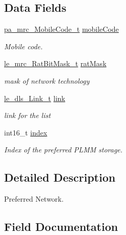 \subsection*{Data Fields}
\begin{DoxyCompactItemize}
\item 
\hyperlink{structpa__mrc___mobile_code__t}{pa\+\_\+mrc\+\_\+\+Mobile\+Code\+\_\+t} \hyperlink{structpa__mrc___preferred_network_operator__t_ab7cbecf26c76d4796fb5f2a2b1e22852}{mobile\+Code}
\begin{DoxyCompactList}\small\item\em Mobile code. \end{DoxyCompactList}\item 
\hyperlink{le__mrc__interface_8h_af643c7005da7f2466302eebdf7a29d93}{le\+\_\+mrc\+\_\+\+Rat\+Bit\+Mask\+\_\+t} \hyperlink{structpa__mrc___preferred_network_operator__t_abc5904f992fb84a3d3fc6d31bba9f298}{rat\+Mask}
\begin{DoxyCompactList}\small\item\em mask of network technology \end{DoxyCompactList}\item 
\hyperlink{structle__dls___link__t}{le\+\_\+dls\+\_\+\+Link\+\_\+t} \hyperlink{structpa__mrc___preferred_network_operator__t_a57d2ec6d8cab04a70c71845af919f635}{link}
\begin{DoxyCompactList}\small\item\em link for the list \end{DoxyCompactList}\item 
int16\+\_\+t \hyperlink{structpa__mrc___preferred_network_operator__t_aa63e187d3ab1e729d7df72a8e377c690}{index}
\begin{DoxyCompactList}\small\item\em Index of the preferred P\+L\+MM storage. \end{DoxyCompactList}\end{DoxyCompactItemize}


\subsection{Detailed Description}
Preferred Network. 

\subsection{Field Documentation}
